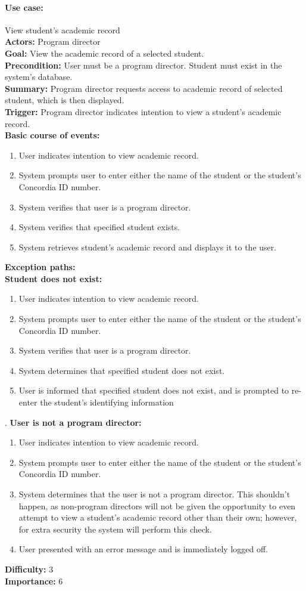 \documentclass[12pt]{article}
\begin{document}
\paragraph*{Use case:} View student's academic record\\
\textbf{Actors:} Program director\\
\textbf{Goal:} View the academic record of a selected student.\\
\textbf{Precondition:} User must be a program director. Student must exist in the system's database.\\
\textbf{Summary:} Program director requests access to academic record of selected student, which is then displayed.\\
\textbf{Trigger:} Program director indicates intention to view a student's academic record.\\
\textbf{Basic course of events:}
\begin{enumerate}
\item User indicates intention to view academic record.
\item System prompts user to enter either the name of the student or the student's Concordia ID number.
\item System verifies that user is a program director.
\item System verifies that specified student exists.
\item System retrieves student's academic record and displays it to the user.
\end{enumerate}
\textbf{Exception paths:}\\
\textbf{Student does not exist:}
\begin{enumerate}
\item User indicates intention to view academic record.
\item System prompts user to enter either the name of the student or the student's Concordia ID number.
\item System verifies that user is a program director.
\item System determines that specified student does not exist.
\item User is informed that specified student does not exist, and is prompted to re-enter the student's identifying information
\end{enumerate}.
\textbf{User is not a program director:}
\begin{enumerate}
\item User indicates intention to view academic record.
\item System prompts user to enter either the name of the student or the student's Concordia ID number.
\item System determines that the user is not a program director. This shouldn't happen, as non-program directors will not be given the opportunity to even attempt to view a student's academic record other than their own; however, for extra security the system will perform this check.
\item User presented with an error message and is immediately logged off.
\end{enumerate}
\textbf{Difficulty:} 3\\
\textbf{Importance:} 6\\
\end{document}
